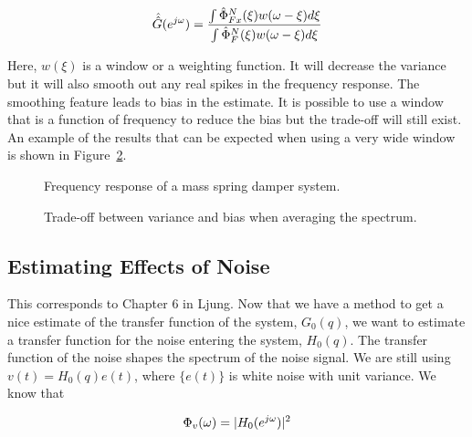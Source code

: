 \begin{equation*}
\hat{\hat{G}}(e^{j\omega}) = \frac{\int\hat{\Phi}_{Fx}^N(\xi)w(\omega-\xi)d\xi}{\int \hat{\Phi}_F^N(\xi)w(\omega-\xi)d\xi}
\end{equation*}

Here, $w(\xi)$ is a window or a weighting function.
It will decrease the variance but it will also smooth out any real spikes in the frequency response.
The smoothing feature leads to bias in the estimate.
It is possible to use a window that is a function of frequency to reduce the bias but the trade-off will still exist.
An example of the results that can be expected when using a very wide window is shown in Figure~\ref{fig:07tradeoff}.

\begin{figure}[ht!]
\centering
{} \hfill
{} \hfill
\caption{Frequency response of a mass spring damper system.}%
\label{fig:07msd}
\end{figure}

\begin{figure}[ht!]
\centering
{} \hfill
{} \hfill
\caption{Trade-off between variance and bias when averaging the spectrum.}%
\label{fig:07tradeoff}
\end{figure}

\subsection{Estimating Effects of Noise}
This corresponds to Chapter 6 in Ljung.
Now that we have a method to get a nice estimate of the transfer function of the system, $G_0(q)$, we want to estimate a transfer function for the noise entering the system, $H_0(q)$.
The transfer function of the noise shapes the spectrum of the noise signal.
We are still using $v(t) = H_0(q)e(t)$, where $\{e(t)\}$ is white noise with unit variance.
We know that

\begin{equation*}
\Phi_v(\omega) = |H_0(e^{j\omega})|^2
\end{equation*}

